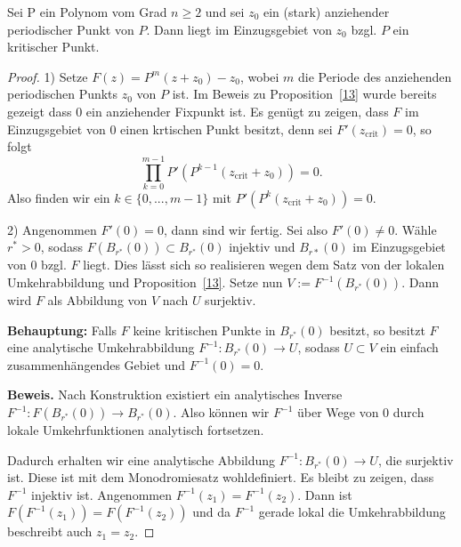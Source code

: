 \documentclass{mywork}
\begin{document}
\begin{thm} \label{last}
Sei P ein Polynom vom Grad $n\ge 2$ und sei $z_0$ ein (stark) anziehender periodischer Punkt von $P$. Dann liegt im Einzugsgebiet von $z_0$ bzgl. $P$ ein kritischer Punkt.
\end{thm}

\begin{proof}
1) Setze $F(z)=P^m(z+z_0)-z_0$, wobei $m$ die Periode des anziehenden periodischen Punkts $z_0$ von $P$ ist. Im Beweis zu Proposition~\ref{13} wurde bereits gezeigt dass $0$ ein anziehender Fixpunkt ist.  Es genügt zu zeigen, dass $F$ im Einzugsgebiet von $0$ einen krtischen Punkt besitzt, denn sei $F'(z_{\mathrm{crit}})=0$, so folgt
\[
	\prod_{k=0}^{m-1} P'(P^{k-1}(z_{\mathrm{crit}}+z_0))=0.
\]
Also finden wir ein $k\in \{0,...,m-1\}$ mit $P'(P^k(z_{\mathrm{crit}}+z_0))=0$.

2) Angenommen $F'(0)=0$, dann sind wir fertig. Sei also $F'(0)\neq 0$. Wähle $r^*>0$, sodass $F(B_{r^*}(0))\subset B_{r^*}(0)$ injektiv und $B_{r*}(0)$ im Einzugsgebiet von $0$ bzgl. $F$ liegt. Dies lässt sich so realisieren wegen dem Satz von der lokalen Umkehrabbildung und Proposition~\ref{13}. Setze nun $V:=F^{-1}(B_{r^*}(0))$. Dann wird $F$ als Abbildung von $V$ nach $U$ surjektiv.

\textbf{Behauptung:} Falls $F$ keine kritischen Punkte in $B_{r^*}(0)$ besitzt, so besitzt $F$ eine analytische Umkehrabbildung $F^{-1}: B_{r^*}(0) \to U$, sodass $U\subset V$ ein einfach zusammenhängendes Gebiet und $F^{-1}(0)=0$.

\textbf{Beweis.} Nach Konstruktion existiert ein analytisches Inverse $F^{-1}: F(B_{r^*}(0)) \to B_{r^*}(0)$. Also können wir $F^{-1}$ über Wege von $0$ durch lokale Umkehrfunktionen analytisch fortsetzen.

\begin{figure}[H]
\centering
{}
\end{figure}

Dadurch erhalten wir eine analytische Abbildung $F^{-1}: B_{r^*}(0) \to U$, die surjektiv ist. Diese ist mit dem Monodromiesatz wohldefiniert. Es bleibt zu zeigen, dass $F^{-1}$ injektiv ist. Angenommen $F^{-1}(z_1)=F^{-1}(z_2)$. Dann ist $F(F^{-1}(z_1))=F(F^{-1}(z_2))$ und da $F^{-1}$ gerade lokal die Umkehrabbildung beschreibt auch $z_1=z_2$.


\end{proof}
\end{document}
